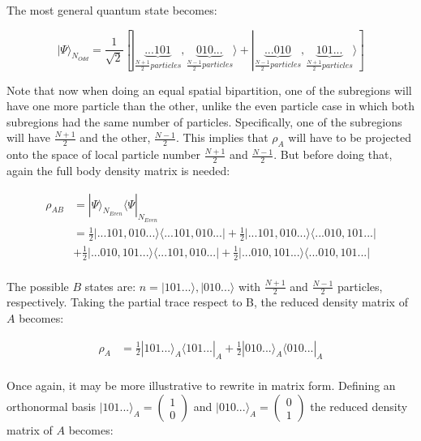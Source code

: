 \begin{samepage}
	The most general quantum state becomes:
	
	\begin{equation}
	| \Psi \rangle_{N_{Odd}} = \frac{1}{\sqrt{2}} [|\underbrace{...101}_{\frac{N+1}{2} particles}, \underbrace{010...}_{\frac{N-1}{2} particles} \rangle + |\underbrace{...010}_{\frac{N-1}{2} particles}, \underbrace{101...}_{\frac{N+1}{2} particles} \rangle ]
	\end{equation}
	
	Note that now when doing an equal spatial bipartition, one of the subregions will have one more particle than the other, unlike the even particle case in which both subregions had the same number of particles. Specifically, one of the subregions will have $\frac{N+1}{2}$ and the other, $\frac{N-1}{2}$. This implies that $\rho_{A}$ will have to be projected onto the space of local particle number $\frac{N+1}{2}$ and $\frac{N-1}{2}$. But before doing that, again the full body density matrix is needed:
	
	\begin{equation}
	\begin{aligned}
\rho_{AB} &= | \Psi \rangle_{N_{Even}} \langle \Psi |_{N_{Even}} \\
&= \frac{1}{2} |...101,010... \rangle \langle ...101,010... | + \frac{1}{2} |...101,010... \rangle \langle ...010,101... |  \\
&+ \frac{1}{2} |...010,101... \rangle \langle ...101,010... | + \frac{1}{2} |...010,101... \rangle \langle ...010,101... |  \\
	\end{aligned}
	\end{equation}
	
The possible $B$ states are: $n = | 101... \rangle, | 010... \rangle$ with $\frac{N+1}{2}$ and $\frac{N-1}{2}$ particles, respectively. Taking the partial trace respect to B, the reduced density matrix of $A$ becomes:
	
	\begin{equation}
\begin{aligned}
\rho_{A} &= \frac{1}{2} | 101... \rangle_{A} \langle 101... |_{A} +  \frac{1}{2} | 010... \rangle_{A} \langle 010... |_{A} \\
\end{aligned}
\end{equation}

Once again, it may be more illustrative to rewrite in matrix form. Defining an orthonormal basis $| 101... \rangle_{A}  = \begin{pmatrix} 1 \\ 0\end{pmatrix}$ and $| 010... \rangle_{A}  = \begin{pmatrix} 0 \\ 1\end{pmatrix}$ the reduced density matrix of $A$ becomes:


\end{samepage}
